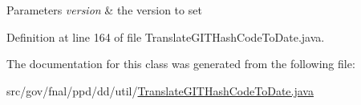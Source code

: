 \begin{DoxyParams}{Parameters}
{\em version} & the version to set \\
\hline
\end{DoxyParams}


Definition at line 164 of file Translate\-G\-I\-T\-Hash\-Code\-To\-Date.\-java.



The documentation for this class was generated from the following file\-:\begin{DoxyCompactItemize}
\item 
src/gov/fnal/ppd/dd/util/\hyperlink{TranslateGITHashCodeToDate_8java}{Translate\-G\-I\-T\-Hash\-Code\-To\-Date.\-java}\end{DoxyCompactItemize}
